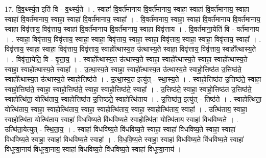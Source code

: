\documentclass[17pt]{extarticle}
\begin{document}
17. वि॒व॒र्थ्स्य॒त इति॑ वि - व॒र्थ्स्य॒ते । . स्वाहा॑ वि॒वर्त॑मानाय वि॒वर्त॑मानाय॒ स्वाहा॒ स्वाहा॑ वि॒वर्त॑मानाय॒ स्वाहा॒ स्वाहा॑ वि॒वर्त॑मानाय॒ स्वाहा॒ स्वाहा॑ वि॒वर्त॑मानाय॒ स्वाहा᳚ । . वि॒वर्त॑मानाय॒ स्वाहा॒ स्वाहा॑ वि॒वर्त॑मानाय वि॒वर्त॑मानाय॒ स्वाहा॒ विवृ॑त्ताय॒ विवृ॑त्ताय॒ स्वाहा॑ वि॒वर्त॑मानाय वि॒वर्त॑मानाय॒ स्वाहा॒ विवृ॑त्ताय । . वि॒वर्त॑माना॒येति॑ वि - वर्त॑मानाय । . स्वाहा॒ विवृ॑त्ताय॒ विवृ॑त्ताय॒ स्वाहा॒ स्वाहा॒ विवृ॑त्ताय॒ स्वाहा॒ स्वाहा॒ विवृ॑त्ताय॒ स्वाहा॒ स्वाहा॒ विवृ॑त्ताय॒ स्वाहा᳚ । . विवृ॑त्ताय॒ स्वाहा॒ स्वाहा॒ विवृ॑त्ताय॒ विवृ॑त्ताय॒ स्वाहो᳚त्थास्य॒त उ॑त्थास्य॒ते स्वाहा॒ विवृ॑त्ताय॒ विवृ॑त्ताय॒ स्वाहो᳚त्थास्य॒ते । . विवृ॑त्ता॒येति॒ वि - वृ॒त्ता॒य॒ । . स्वाहो᳚त्थास्य॒त उ॑त्थास्य॒ते स्वाहा॒ स्वाहो᳚त्थास्य॒ते स्वाहा॒ स्वाहो᳚त्थास्य॒ते स्वाहा॒ स्वाहो᳚त्थास्य॒ते स्वाहा᳚ । . उ॒त्था॒स्य॒ते स्वाहा॒ स्वाहो᳚त्थास्य॒त उ॑त्थास्य॒ते स्वाहो॒त्तिष्ठ॑त उ॒त्तिष्ठ॑ते॒ स्वाहो᳚त्थास्य॒त उ॑त्थास्य॒ते स्वाहो॒त्तिष्ठ॑ते । . उ॒त्था॒स्य॒त इत्यु॑त् - स्था॒स्य॒ते । . स्वाहो॒त्तिष्ठ॑त उ॒त्तिष्ठ॑ते॒ स्वाहा॒ स्वाहो॒त्तिष्ठ॑ते॒ स्वाहा॒ स्वाहो॒त्तिष्ठ॑ते॒ स्वाहा॒ स्वाहो॒त्तिष्ठ॑ते॒ स्वाहा᳚ । . उ॒त्तिष्ठ॑ते॒ स्वाहा॒ स्वाहो॒त्तिष्ठ॑त उ॒त्तिष्ठ॑ते॒ स्वाहोत्थि॑ता॒ योत्थि॑ताय॒ स्वाहो॒त्तिष्ठ॑त उ॒त्तिष्ठ॑ते॒ 
स्वाहोत्थि॑ताय । . उ॒त्तिष्ठ॑त॒ इत्यु॑त् - तिष्ठ॑ते । . स्वाहोत्थि॑ता॒ योत्थि॑ताय॒ स्वाहा॒ स्वाहोत्थि॑ताय॒ स्वाहा॒ स्वाहोत्थि॑ताय॒ स्वाहा॒ स्वाहोत्थि॑ताय॒ स्वाहा᳚ । . उत्थि॑ताय॒ स्वाहा॒ स्वाहोत्थि॑ता॒ योत्थि॑ताय॒ स्वाहा॑ विधविष्य॒ते वि॑धविष्य॒ते स्वाहोत्थि॑ता॒ योत्थि॑ताय॒ स्वाहा॑ विधविष्य॒ते । . उत्थि॑ता॒येत्युत् - स्थि॒ता॒य॒ । . स्वाहा॑ विधविष्य॒ते वि॑धविष्य॒ते स्वाहा॒ स्वाहा॑ विधविष्य॒ते स्वाहा॒ स्वाहा॑ विधविष्य॒ते स्वाहा॒ स्वाहा॑ विधविष्य॒ते स्वाहा᳚ । . वि॒ध॒वि॒ष्य॒ते स्वाहा॒ स्वाहा॑ विधविष्य॒ते वि॑धविष्य॒ते स्वाहा॑ विधून्वा॒नाय॑ विधून्वा॒नाय॒ स्वाहा॑ विधविष्य॒ते वि॑धविष्य॒ते स्वाहा॑ विधून्वा॒नाय॑ । \newline
\end{document}
